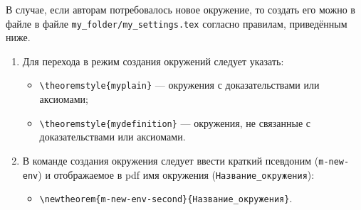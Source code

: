 В случае, если авторам потребовалось новое окружение, то создать его можно в файле в файле \texttt{my\_fol\-der/{}my\_set\-tings.tex} согласно правилам, приведённым ниже.

\begin{enumerate}[1.]
	\item Для перехода в режим создания окружений следует указать:
	\begin{itemize}
		\item \verb|\theoremstyle{myplain}| --- окружения с доказательствами или аксиомами;
		\item \verb|\theoremstyle{mydefinition}| --- окружения, не связанные с доказательствами или аксиомами.
	\end{itemize}
	\item В команде создания окружения следует ввести краткий псевдоним (\verb|m-new-env|) и отображаемое в pdf имя окружения (\verb|Название_окружения|):
	\begin{itemize}
		\item \texttt{\textbackslash{}newtheorem\{m-new-env-second\}\{Название\_окруже\-ния\}\-[chap\-ter]}.
	\end{itemize}
\end{enumerate}


%
